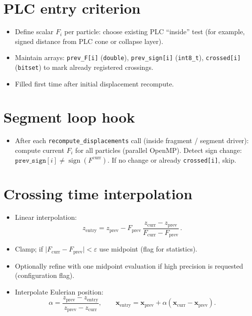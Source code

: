 \documentclass[11pt]{article}
\begin{document}
\section{PLC entry criterion}
\begin{itemize}
  \item Define scalar \(F_i\) per particle: choose existing PLC ``inside'' test (for example, signed distance from PLC cone or collapse layer).
  \item Maintain arrays: \verb|prev_F[i]| (\verb|double|), \verb|prev_sign[i]| (\verb|int8_t|), \verb|crossed[i]| (\verb|bitset|) to mark already registered crossings.
  \item Filled first time after initial displacement recompute.
\end{itemize}

\section{Segment loop hook}
\begin{itemize}
  \item After each \verb|recompute_displacements| call (inside fragment / segment driver): compute current \(F_i\) for all particles (parallel OpenMP). Detect sign change: \(\texttt{prev\_sign}[i] \neq \operatorname{sign}(F^{\text{curr}})\). If no change or already \verb|crossed[i]|, skip.
\end{itemize}

\section{Crossing time interpolation}
\begin{itemize}
  \item Linear interpolation:
  \[
  z_{\mathrm{entry}} = z_{\mathrm{prev}}
  - F_{\mathrm{prev}}\,
  \frac{z_{\mathrm{curr}} - z_{\mathrm{prev}}}{F_{\mathrm{curr}} - F_{\mathrm{prev}}}\,.
  \]
  \item Clamp; if \(\lvert F_{\mathrm{curr}} - F_{\mathrm{prev}} \rvert < \varepsilon\) use midpoint (flag for statistics).
  \item Optionally refine with one midpoint evaluation if high precision is requested (configuration flag).
  \item Interpolate Eulerian position:
  \[
  \alpha = \frac{z_{\mathrm{prev}} - z_{\mathrm{entry}}}{z_{\mathrm{prev}} - z_{\mathrm{curr}}},\qquad
  \mathbf{x}_{\mathrm{entry}} = \mathbf{x}_{\mathrm{prev}} + \alpha \left(\mathbf{x}_{\mathrm{curr}} - \mathbf{x}_{\mathrm{prev}}\right).
  \]
\end{itemize}
\end{document}
